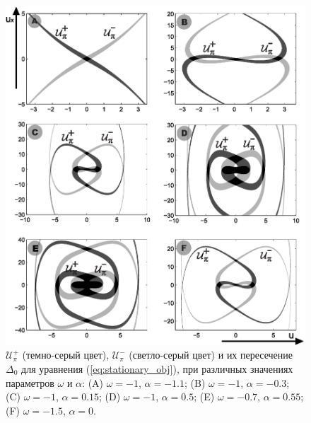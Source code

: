 \begin{figure}
\includegraphics[width=\linewidth]{pic/spirals.eps}
\caption{$\mathcal{U}_{\pi}^{+}$ (темно-серый цвет), $\mathcal{U}_{\pi}^{-}$ (светло-серый цвет) и их пересечение $\Delta_{0}$ для уравнения (\ref{eq:stationary_obj}), при различных значениях параметров $\omega$ и $\alpha$: (A) $\omega = -1$, $\alpha = -1.1$; (B) $\omega = -1$, $\alpha = -0.3$; (C) $\omega = -1$, $\alpha = 0.15$; (D) $\omega = -1$, $\alpha = 0.5$; (E) $\omega = -0.7$, $\alpha = 0.55$; (F) $\omega = -1.5$, $\alpha = 0$.}
\label{pic:spirals}
\end{figure}
%

